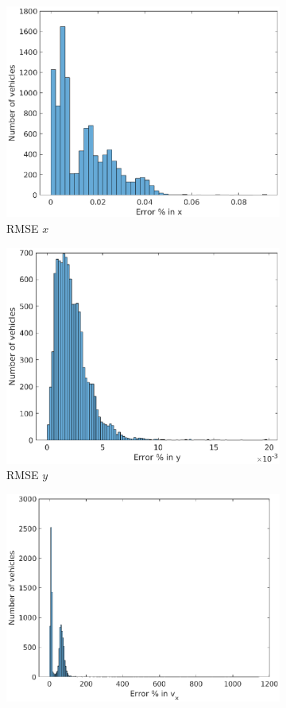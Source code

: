 \begin{figure}
\begin{subfigure}{.5\textwidth}
\centering
\includegraphics[width=.8\linewidth]{figures/s_caXerror}
\caption{RMSE $x$}
\end{subfigure}
\begin{subfigure}{.5\textwidth}
\centering
\includegraphics[width=.8\linewidth]{figures/s_caYerror}
\caption{RMSE $y$}
\end{subfigure}
\begin{subfigure}{.5\textwidth}
\centering
\includegraphics[width=.8\linewidth]{figures/s_cavXerror}

\end{subfigure}
\end{figure}

